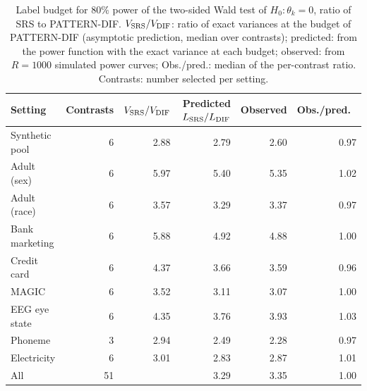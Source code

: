 \documentclass[pdflatex,sn-mathphys-num,iicol]{sn-jnl}
\theoremstyle{thmstyleone}
\theoremstyle{thmstyletwo}
\theoremstyle{thmstylethree}
\begin{document}
\begin{table}[t]
\centering\footnotesize
\caption{Label budget for $80\%$ power of the two-sided Wald test of $H_0:\theta_k=0$, ratio of SRS to PATTERN-DIF. $V_{\rm SRS}/V_{\rm DIF}$: ratio of exact variances at the budget of PATTERN-DIF (asymptotic prediction, median over contrasts); predicted: from the power function with the exact variance at each budget; observed: from $R=1000$ simulated power curves; Obs./pred.: median of the per-contrast ratio. Contrasts: number selected per setting.}\label{tab:test-power}
\begin{tabular}{lrrrrr}\toprule
Setting & Contrasts & $V_{\rm SRS}/V_{\rm DIF}$ & Predicted $L_{\rm SRS}/L_{\rm DIF}$ & Observed & Obs./pred.\ \\\midrule
Synthetic pool & 6 & 2.88 & 2.79 & 2.60 & 0.97 \\
Adult (sex) & 6 & 5.97 & 5.40 & 5.35 & 1.02 \\
Adult (race) & 6 & 3.57 & 3.29 & 3.37 & 0.97 \\
Bank marketing & 6 & 5.88 & 4.92 & 4.88 & 1.00 \\
Credit card & 6 & 4.37 & 3.66 & 3.59 & 0.96 \\
MAGIC & 6 & 3.52 & 3.11 & 3.07 & 1.00 \\
EEG eye state & 6 & 4.35 & 3.76 & 3.93 & 1.03 \\
Phoneme & 3 & 2.94 & 2.49 & 2.28 & 0.97 \\
Electricity & 6 & 3.01 & 2.83 & 2.87 & 1.01 \\
\midrule
All & 51 & & 3.29 & 3.35 & 1.00 \\
\bottomrule\end{tabular}

\end{table}
\end{document}
